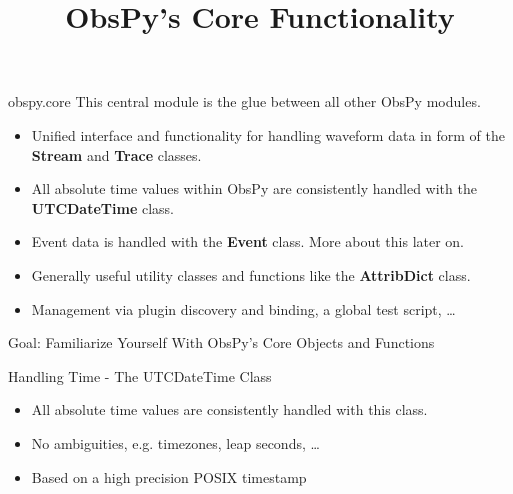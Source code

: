 
\title{ObsPy's Core Functionality}


\frame[plain]{\titlepage}

\begin{frame}{obspy.core}
This central module is the glue between all other ObsPy modules.

    \begin{itemize}
        \item Unified interface and functionality for handling waveform data in
            form of the \textbf{Stream} and \textbf{Trace} classes.
        \item All absolute time values within ObsPy are consistently handled
            with the \textbf{UTCDateTime} class.
        \item Event data is handled with the \textbf{Event} class. More about
            this later on.
        \item Generally useful utility classes and functions like the
            \textbf{AttribDict} class.
        \item Management via plugin discovery and binding, a global test
            script, \ldots
    \end{itemize}
\end{frame}


\begin{frame}{}
    \begin{center}
        \textcolor{lmu@darkgreen}{\LARGE{Goal: Familiarize Yourself With ObsPy's Core Objects and Functions}}
    \end{center}
\end{frame}


\begin{frame}{Handling Time - The UTCDateTime Class}
    \begin{itemize}
        \item All absolute time values are consistently handled with this class.
        \item No ambiguities, e.g. timezones, leap seconds, \dots
        \item Based on a high precision POSIX timestamp
    \end{itemize}
\end{frame}


